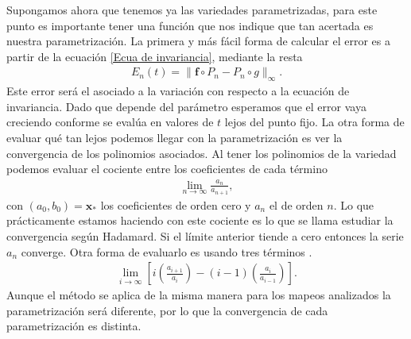 Supongamos ahora que tenemos ya las variedades parametrizadas, para este punto es importante tener una función que nos indique que tan acertada es nuestra parametrización. La primera y más fácil forma de calcular el error es a partir de la ecuación \ref{Ecua de invariancia}, mediante la resta
\begin{eqnarray}
E_{n}(t) = \parallel \mathbf{f} \circ P_{n} - P_{n} \circ g \parallel_{\infty}.  \label{Ecua de invariancia resta}
\end{eqnarray}
Este error será el asociado a la variación con respecto a la ecuación de invariancia. Dado que depende del parámetro esperamos que el error vaya creciendo conforme se evalúa en valores de $t$ lejos del punto fijo. La otra forma de evaluar qué tan lejos podemos llegar con la parametrización es ver la convergencia de los polinomios asociados. Al tener los polinomios de la variedad podemos evaluar el cociente entre los coeficientes de cada término
\begin{eqnarray}
\lim_{n\rightarrow\infty}\frac{a_{n}}{a_{n+1}},\label{hadamard}
\end{eqnarray} 
con $(a_{0},b_{0})=\mathbf{x}_{*}$ los coeficientes de orden cero y $a_{n}$ el de orden $n$. Lo que prácticamente estamos haciendo con este cociente es lo que se llama estudiar la convergencia según Hadamard. Si el límite anterior tiende a cero entonces la serie $a_{n}$ converge. Otra forma de evaluarlo es usando tres términos \citep{Chang}.
\begin{eqnarray}
\lim_{i\rightarrow\infty} \left[ i\left(\frac{a_{i+1}}{a_{i}}\right)-(i-1)\left(\frac{a_{i}}{a_{i-1}}\right) \right].
\label{tres terminos}
\end{eqnarray}
Aunque el método se aplica de la misma manera para los mapeos analizados la parametrización será diferente, por lo que la convergencia de cada parametrización es distinta. 